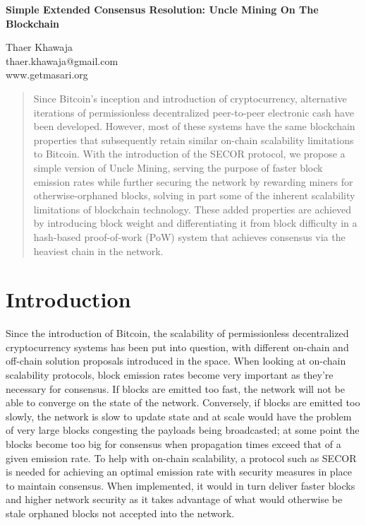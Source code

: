 \documentclass{article}
\begin{document}
\begin{center}
  \textbf{Simple Extended Consensus Resolution: Uncle Mining On The Blockchain}\\
  \vspace{5mm}

  {\small
    Thaer Khawaja\\
    thaer.khawaja@gmail.com\\
    www.getmasari.org\\
  }
  \vspace{5mm}
\end{center}

\begin{abstract}
  Since Bitcoin's inception and introduction of cryptocurrency\cite{nakamoto}, alternative iterations of permissionless decentralized peer-to-peer electronic cash have been developed. However, most of these systems have the same blockchain properties that subsequently retain similar on-chain scalability limitations to Bitcoin. With the introduction of the SECOR protocol, we propose a simple version of Uncle Mining, serving the purpose of faster block emission rates while further securing the network by rewarding miners for otherwise-orphaned blocks, solving in part some of the inherent scalability limitations of blockchain technology. These added properties are achieved by introducing block weight and differentiating it from block difficulty in a hash-based proof-of-work (PoW) system that achieves consensus via the heaviest chain in the network.
\end{abstract}

\section{Introduction}
Since the introduction of Bitcoin, the scalability of permissionless decentralized cryptocurrency systems has been put into question, with different on-chain and off-chain solution proposals introduced in the space. When looking at on-chain scalability protocols, block emission rates become very important as they're necessary for consensus. If blocks are emitted too fast, the network will not be able to converge on the state of the network. Conversely, if blocks are emitted too slowly, the network is slow to update state and at scale would have the problem of very large blocks congesting the payloads being broadcasted; at some point the blocks become too big for consensus when propagation times exceed that of a given emission rate. To help with on-chain scalability, a protocol such as SECOR is needed for achieving an optimal emission rate with security measures in place to maintain consensus. When implemented, it would in turn deliver faster blocks and higher network security as it takes advantage of what would otherwise be stale orphaned blocks not accepted into the network.
\end{document}

